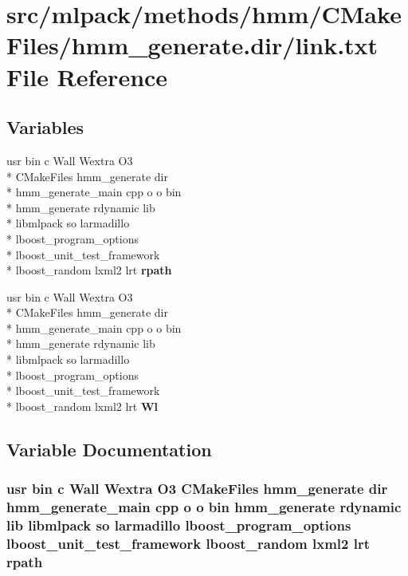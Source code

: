 \section{src/mlpack/methods/hmm/\-C\-Make\-Files/hmm\-\_\-generate.dir/link.txt File Reference}
\label{methods_2hmm_2CMakeFiles_2hmm__generate_8dir_2link_8txt}
\subsection*{Variables}
\begin{DoxyCompactItemize}
\item 
usr bin c Wall Wextra O3 \\*
C\-Make\-Files hmm\-\_\-generate dir \\*
hmm\-\_\-generate\-\_\-main cpp o o bin \\*
hmm\-\_\-generate rdynamic lib \\*
libmlpack so larmadillo \\*
lboost\-\_\-program\-\_\-options \\*
lboost\-\_\-unit\-\_\-test\-\_\-framework \\*
lboost\-\_\-random lxml2 lrt {\bf rpath}
\item 
usr bin c Wall Wextra O3 \\*
C\-Make\-Files hmm\-\_\-generate dir \\*
hmm\-\_\-generate\-\_\-main cpp o o bin \\*
hmm\-\_\-generate rdynamic lib \\*
libmlpack so larmadillo \\*
lboost\-\_\-program\-\_\-options \\*
lboost\-\_\-unit\-\_\-test\-\_\-framework \\*
lboost\-\_\-random lxml2 lrt {\bf Wl}
\end{DoxyCompactItemize}


\subsection{Variable Documentation}
\subsubsection[{rpath}]{\setlength{\rightskip}{0pt plus 5cm}usr bin c Wall Wextra O3 C\-Make\-Files hmm\-\_\-generate dir hmm\-\_\-generate\-\_\-main cpp o o bin hmm\-\_\-generate rdynamic lib libmlpack so larmadillo lboost\-\_\-program\-\_\-options lboost\-\_\-unit\-\_\-test\-\_\-framework lboost\-\_\-random lxml2 lrt rpath}\label{methods_2hmm_2CMakeFiles_2hmm__generate_8dir_2link_8txt_ad576c37003492bd50adcdb6852c645db}


